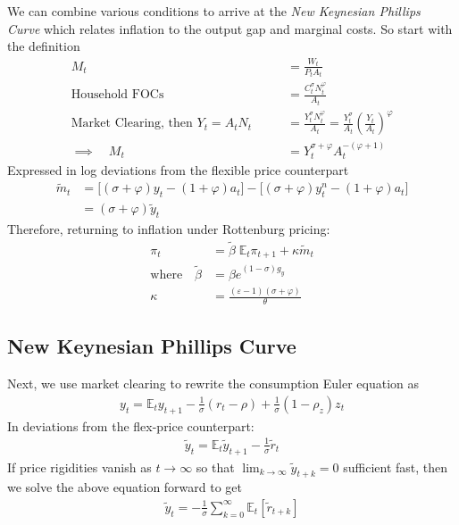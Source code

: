 \documentclass[12pt]{article}
\theoremstyle{plain}
\theoremstyle{definition}
\theoremstyle{remark}
\newcommand{\ra}{\rightarrow}
\newcommand{\E}{\mathbb{E}}
\begin{document}
We can combine various conditions to arrive at the
\emph{New Keynesian Phillips Curve} which relates inflation to the
output gap and marginal costs. So start with the definition
\begin{align*}
  M_t
  &= \frac{W_t}{P_tA_t} \\
  \text{Household FOCs}\qquad
  &= \frac{C_t^\sigma N_t^\varphi}{A_t}
  \\
  \text{Market Clearing, then $Y_t=A_tN_t$}\qquad
  &= \frac{Y_t^\sigma N_t^\varphi}{A_t}
  =
  \frac{Y_t^\sigma}{A_t}
  \left(
  \frac{Y_t}{A_t}
  \right)^\varphi \\
  \implies\quad
  M_t &= Y_t^{\sigma+\varphi}A_t^{-(\varphi+1)}
\end{align*}
Expressed in log deviations from the flexible price counterpart
\begin{align*}
  \tilde{m}_t
  &=
  \big[(\sigma+\varphi)y_t-(1+\varphi)a_t\big]
  -
  \big[(\sigma+\varphi)y^n_t-(1+\varphi)a_t\big]
  \\
  &=
  \left(\sigma+\varphi\right)
  \tilde{y}_t
\end{align*}
Therefore, returning to inflation under Rottenburg pricing:
\begin{align*}
  \pi_t &= \tilde{\beta}\;\E_t\pi_{t+1} + \kappa \tilde{m}_t \\
  \text{where}\quad
  \tilde{\beta} &=
    \beta e^{(1-\sigma)g_y} \\
  \kappa &=
    \frac{(\varepsilon-1)(\sigma+\varphi)}{\theta}
\end{align*}


\subsection{New Keynesian Phillips Curve}

Next, we use market clearing to rewrite the consumption Euler equation
as
\begin{align*}
  y_t = \E_ty_{t+1}
  - \frac{1}{\sigma}(r_t-\rho)
  + \frac{1}{\sigma}(1-\rho_z)z_t
\end{align*}
In deviations from the flex-price counterpart:
\begin{align*}
  \tilde{y}_t
  = \E_t\tilde{y}_{t+1}
  - \frac{1}{\sigma}\tilde{r}_t
\end{align*}
If price rigidities vanish as $t\ra\infty$ so that
$\lim_{k\ra\infty}\tilde{y}_{t+k}=0$ sufficient fast, then we solve
the above equation forward to get
\begin{align*}
  \tilde{y}_t
  =
  - \frac{1}{\sigma}
  \sum_{k=0}^\infty \E_t[\tilde{r}_{t+k}]
\end{align*}










\end{document}
